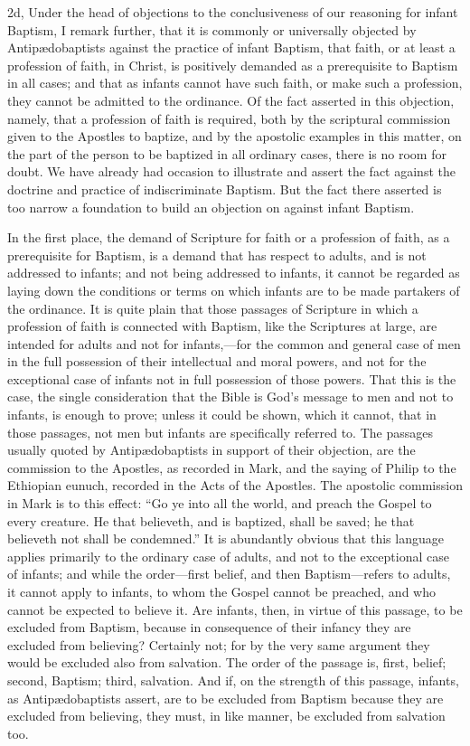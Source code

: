 \documentclass[]{book}
\begin{document}
2d, Under the head of objections to the conclusiveness of our reasoning for infant Baptism, I remark further, that it is commonly or universally objected by Antipædobaptists against the practice of infant Baptism, that faith, or at least a profession of faith, in Christ, is positively demanded as a prerequisite to Baptism in all cases; and that as infants cannot have such faith, or make such a profession, they cannot be admitted to the ordinance. Of the fact asserted in this objection, namely, that a profession of faith is required, both by the scriptural commission given to the Apostles to baptize, and by the apostolic examples in this matter, on the part of the person to be baptized in all ordinary cases, there is no room for doubt. We have already had occasion to illustrate and assert the fact against the doctrine and practice of indiscriminate Baptism. But the fact there asserted is too narrow a foundation to build an objection on against infant Baptism.

In the first place, the demand of Scripture for faith or a profession of faith, as a prerequisite for Baptism, is a demand that has respect to adults, and is not addressed to infants; and not being addressed to infants, it cannot be regarded as laying down the conditions or terms on which infants are to be made partakers of the ordinance. It is quite plain that those passages of Scripture in which a profession of faith is connected with Baptism, like the Scriptures at large, are intended for adults and not for infants,---for the common and general case of men in the full possession of their intellectual and moral powers, and not for the exceptional case of infants not in full possession of those powers. That this is the case, the single consideration that the Bible is God's message to men and not to infants, is enough to prove; unless it could be shown, which it cannot, that in those passages, not men but infants are specifically referred to. The passages usually quoted by Antipædobaptists in support of their objection, are the commission to the Apostles, as recorded in Mark, and the saying of Philip to the Ethiopian eunuch, recorded in the Acts of the Apostles. The apostolic commission in Mark is to this effect: ``Go ye into all the world, and preach the Gospel to every creature. He that believeth, and is baptized, shall be saved; he that believeth not shall be condemned.'' It is abundantly obvious that this language applies primarily to the ordinary case of adults, and not to the exceptional case of infants; and while the order---first belief, and then Baptism---refers to adults, it cannot apply to infants, to whom the Gospel cannot be preached, and who cannot be expected to believe it. Are infants, then, in virtue of this passage, to be excluded from Baptism, because in consequence of their infancy they are excluded from believing? Certainly not; for by the very same argument they would be excluded also from salvation. The order of the passage is, first, belief; second, Baptism; third, salvation. And if, on the strength of this passage, infants, as Antipædobaptists assert, are to be excluded from Baptism because they are excluded from believing, they must, in like manner, be excluded from salvation too.
\end{document}
